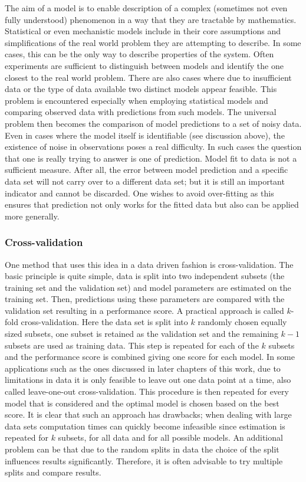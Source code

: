 The aim of a model is to enable description of a complex (sometimes not even fully understood) phenomenon in a way that they are tractable by mathematics. Statistical or even mechanistic models include in their core assumptions and simplifications of the real world problem they are attempting to describe. In some cases, this can be the only way to describe properties of the system. Often experiments are sufficient to distinguish between models and identify the one closest to the real world problem. There are also cases where due to insufficient data or the type of data available two distinct models appear feasible. This problem is encountered especially when employing statistical models and comparing observed data with predictions from such models. The universal problem then becomes the comparison of model predictions to a set of noisy data. Even in cases where the model itself is identifiable (see discussion above), the existence of noise in observations poses a real difficulty. In such cases the question that one is really trying to answer is one of prediction. Model fit to data is not a sufficient measure. After all, the error between model prediction and a specific data set will not carry over to a different data set; but it is still an important indicator and cannot be discarded.  One wishes to avoid over-fitting as this ensures that prediction not only works for the fitted data but also can be applied more generally.

\subsubsection{Cross-validation}
\label{sec:cross-validation}

One method that uses this idea in a data driven fashion is cross-validation. The basic principle is quite simple, data  is split into two independent subsets (the training set and the validation set) and model parameters are estimated on the training set. Then, predictions using these parameters are compared with the validation set resulting in a performance score. A practical approach is called $k$-fold cross-validation. Here the data set is split into $k$ randomly chosen equally sized subsets, one subset is retained as the validation set and the remaining $k-1$ subsets are used as training data. This step is repeated for each of the $k$ subsets and the performance score is combined giving one score for each model. In some applications such as the ones discussed in later chapters of this work, due to limitations in data it is only feasible to leave out one data point at a time, also called leave-one-out cross-validation. This procedure is then repeated for every model that is considered and the optimal model is chosen based on the best score. It is clear that such an approach has drawbacks; when dealing with large data sets computation times can quickly become infeasible since estimation is repeated for $k$ subsets, for all data and for all possible models. An additional problem can be that due to the random splits in data the choice of the split influences results significantly. Therefore, it is often advisable to try multiple splits and compare results.

